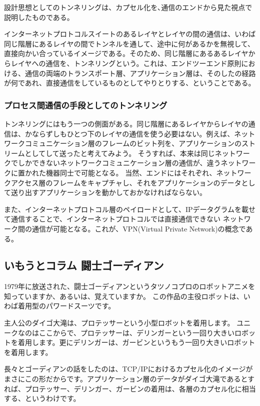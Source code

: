 設計思想としてのトンネリングは、カプセル化を､通信のエンドから見た視点で説明したものである。

インターネットプロトコルスイートのあるレイヤとレイヤの間の通信は、いわば同じ階層にあるレイヤの間でトンネルを通して、途中に何があるかを無視して、直接向かい合っているイメージである。そのため、同じ階層にあるあるレイヤからレイヤへの通信を、トンネリングという。これは、エンドツーエンド原則における、通信の両端のトランスポート層、アプリケーション層は、そのしたの経路が何であれ、直接通信をしているものとしてやりとりする、ということである。


\subsubsection{プロセス間通信の手段としてのトンネリング}

トンネリングにはもう一つの側面がある。同じ階層にあるレイヤからレイヤの通信は、かならずしもひとつ下のレイヤの通信を使う必要はない。例えば、ネットワークコミュニケーション層のフレームのビット列を、アプリケーションのストリームとしてして送ったと考えてみよう。
そうすれば、本来は同じネットワークでしかできないネットワークコミュニケーション層の通信が、違うネットワークに置かれた機器同士で可能となる。
当然、エンドにはそれぞれ、ネットワークアクセス層のフレームをキャプチャし、それをアプリケーションのデータとして送り出すアプリケーションを動かしておかなければならない。

また、インターネットプロトコル層のペイロードとして、IPデータグラムを載せて通信することで、インターネットプロトコルでは直接通信できない
ネットワーク間の通信が可能となる。これが、VPN(Virtual Private Network)の概念である。
\subsection*{いもうとコラム 闘士ゴーディアン}
1979年に放送された、闘士ゴーディアンというタツノコプロのロボットアニメを知っていますか、あるいは、覚えていますか。
この作品の主役ロボットは、いわば着用型のパワードスーツです。

主人公のダイゴ大滝は、プロテッサーという小型ロボットを着用します。
ユニークなのはここからで、プロテッサーは、デリンガーという一回り大きいロボットを着用します。更にデリンガーは、ガービンというもう一回り大きいロボットを着用します。

長々とゴーディアンの話をしたのは、TCP/IPにおけるカプセル化のイメージがまさにこの形だからです。アプリケーション層のデータがダイゴ大滝であるとすれば、プロテッサー、デリンガー、ガービンの着用は、各層のカプセル化に相当する、というわけです。

